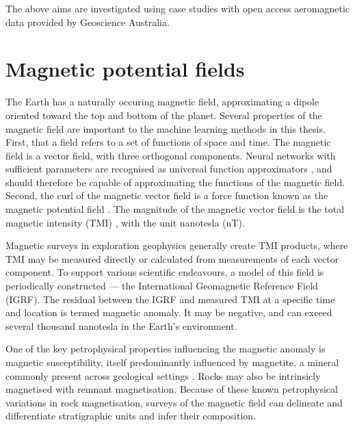The above aims are investigated using case studies with open access aeromagnetic data provided by Geoscience Australia.

\section{Magnetic potential fields}
The Earth has a naturally occuring magnetic field, approximating a dipole oriented toward the top and bottom of the planet.
Several properties of the magnetic field are important to the machine learning methods in this thesis.
First, that a field refers to a set of functions of space and time.
The magnetic field is a vector field, with three orthogonal components.
Neural networks with sufficient parameters are recognised as universal function approximators \parencite{hornikMultilayerFeedforwardNetworks1989}, and should therefore be capable of approximating the functions of the magnetic field.
Second, the curl of the magnetic vector field is a force function known as the magnetic potential field \parencite{kelloggFoundationsPotentialTheory1967}.
The magnitude of the magnetic vector field is the total magnetic intensity (TMI) \parencite{blakelyPotentialTheoryGravity1996}, with the unit nanotesla (nT).

Magnetic surveys in exploration geophysics generally create TMI products, where TMI may be measured directly or calculated from measurements of each vector component.
To support various scientific endeavours, a model of this field is periodically constructed --- the International Geomagnetic Reference Field (IGRF).
The residual between the IGRF and measured TMI at a specific time and location is termed magnetic anomaly.
It may be negative, and can exceed several thousand nanotesla in the Earth's environment.

One of the key petrophysical properties influencing the magnetic anomaly is magnetic susceptibility, itself predominantly influenced by magnetite, a mineral commonly present across geological settings \parencite{clarkNotesRockMagnetization1991}.
Rocks may also be intrinsicly magnetised with remnant magnetisation.
Because of these known petrophysical variations in rock magnetisation, surveys of the magnetic field can delineate and differentiate stratigraphic units and infer their composition.

